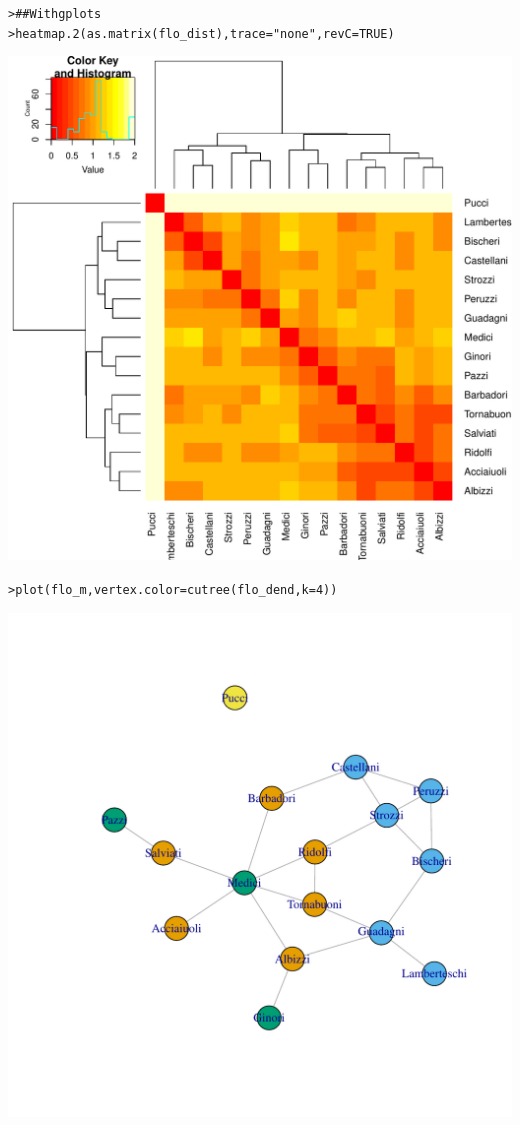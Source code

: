 \documentclass[12pt]{article}\usepackage[]{graphicx}\usepackage[]{color}
\makeatletter
\newcommand{\hlnum}[1]{\textcolor[rgb]{0.82,0.78,0.62}{#1}}%
\newcommand{\hlstr}[1]{\textcolor[rgb]{0.82,0.78,0.62}{#1}}%
\newcommand{\hlcom}[1]{\textcolor[rgb]{0.404,0.408,0.42}{#1}}%
\newcommand{\hlstd}[1]{\textcolor[rgb]{0.882,0.878,0.898}{#1}}%
\newcommand{\hlkwc}[1]{\textcolor[rgb]{0.812,0.522,0.388}{#1}}%
\newcommand{\hlkwd}[1]{\textcolor[rgb]{0.733,0.388,0.812}{#1}}%
\newenvironment{kframe}{%
 \def\at@end@of@kframe{}%
 \ifinner\ifhmode%
  \def\at@end@of@kframe{\end{minipage}}%
  \begin{minipage}{\columnwidth}%
 \fi\fi%
 \def\FrameCommand##1{\hskip\@totalleftmargin \hskip-\fboxsep
 \colorbox{shadecolor}{##1}\hskip-\fboxsep
     \hskip-\linewidth \hskip-\@totalleftmargin \hskip\columnwidth}%
 \MakeFramed {\advance\hsize-\width
   \@totalleftmargin\z@ \linewidth\hsize
   \@setminipage}}%
 {\par\unskip\endMakeFramed%
 \at@end@of@kframe}
\newenvironment{knitrout}{}{} %
\makeatother
\begin{document}
\begin{flushleft}
\begin{center}
\begin{knitrout}
\begin{kframe}\begin{alltt}
\hlstd{> }\hlcom{## With gplots}
\hlstd{> }\hlkwd{heatmap.2}\hlstd{(}\hlkwd{as.matrix}\hlstd{(flo_dist),}\hlkwc{trace}\hlstd{=}\hlstr{"none"}\hlstd{,}\hlkwc{revC}\hlstd{=}\hlnum{TRUE}\hlstd{)}
\end{alltt}
\end{kframe}
\includegraphics[width=6in]{figure/Network_Properties-2} 
\begin{kframe}\begin{alltt}
\hlstd{> }\hlkwd{plot}\hlstd{(flo_m,}\hlkwc{vertex.color}\hlstd{=}\hlkwd{cutree}\hlstd{(flo_dend,} \hlkwc{k}\hlstd{=}\hlnum{4}\hlstd{))}
\end{alltt}
\end{kframe}
\includegraphics[width=6in]{figure/Network_Properties-3} 

\end{knitrout}
\end{center}
\end{flushleft}
\end{document}
